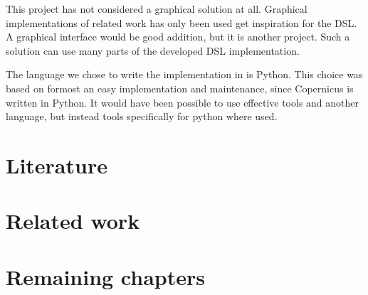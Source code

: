 This project has not considered a graphical solution at all. Graphical
implementations of related work has only been used get inspiration for
the DSL. A graphical interface would be good addition, but it is
another project. Such a solution can use many parts of the developed
DSL implementation.

The language we chose to write the implementation in is Python. This
choice was based on formost an easy implementation and maintenance,
since Copernicus is written in Python. It would have been possible to
use effective tools and another language, but instead tools
specifically for python where used.




\section{Literature}


\section{Related work}

\section{Remaining chapters}

